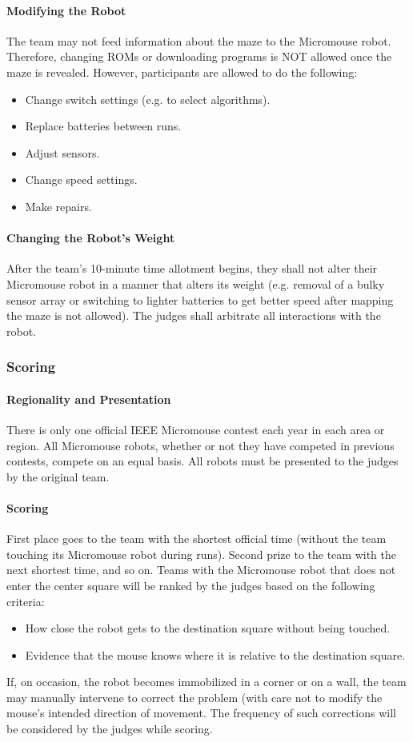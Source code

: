 \documentclass[12pt]{article}
\begin{document}
\paragraph{Modifying the Robot}
The team may not feed information about the \gls{maze} to the \gls{Micromouse} robot.
Therefore, changing ROMs or downloading programs is NOT allowed once the \gls{maze} is
revealed. However, participants are allowed to do the following:
\begin{itemize}
\item Change switch settings (e.g. to select algorithms).
\item Replace batteries between runs.
\item Adjust sensors.
\item Change speed settings.
\item Make repairs.
\end{itemize}
\paragraph{Changing the Robot’s Weight}
After the team’s 10-minute time allotment begins, they shall not alter their \gls{Micromouse}
robot in a manner that alters its weight (e.g. removal of a bulky sensor array or
switching to lighter batteries to get better speed after mapping the \gls{maze} is not
allowed). The judges shall arbitrate all interactions with the robot.
\subsubsection{Scoring} \label{scoring}
\paragraph{Regionality and Presentation}
There is only one official IEEE \gls{Micromouse} contest each year in each area or region. All
\gls{Micromouse} robots, whether or not they have competed in previous contests, compete
on an equal basis. All robots must be presented to the judges by the original team.
\paragraph{Scoring}
First place goes to the team with the shortest official time (without the team touching
its \gls{Micromouse} robot during runs). Second prize to the team with the next shortest
time, and so on. Teams with the \gls{Micromouse} robot that does not enter the center
square will be ranked by the judges based on the following criteria:
\begin{itemize}
\item How close the robot gets to the destination square without being touched.
\item Evidence that the mouse knows where it is relative to the destination square.
\end{itemize}
If, on occasion, the robot becomes immobilized in a corner or on a wall, the team may
manually intervene to correct the problem (with care not to modify the mouse’s
intended direction of movement. The frequency of such corrections will be considered
by the judges while scoring.
\end{document}
